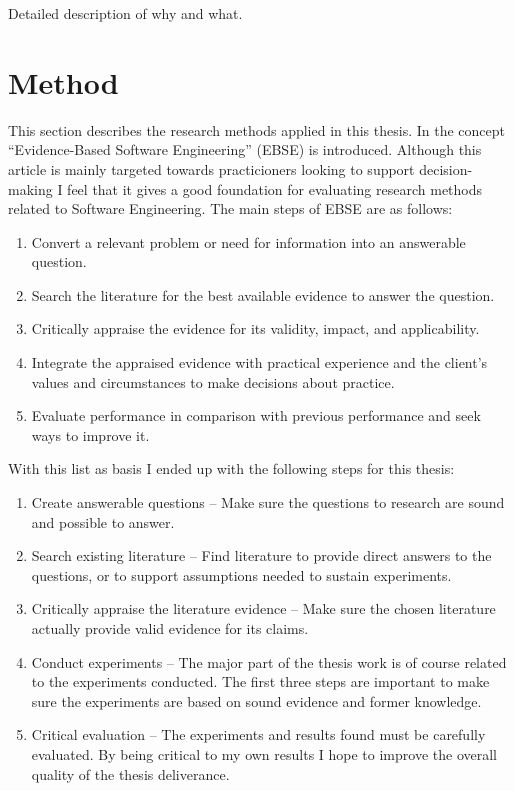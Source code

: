 \documentclass[a4paper,english]{report}
\begin{document}
Detailed description of why and what. 

\section{Method}

This section describes the research methods applied in this
thesis. In\cite{dyb08} the concept ``Evidence-Based Software
Engineering'' (EBSE) is introduced. Although this article is mainly
targeted towards practicioners looking to support decision-making I
feel that it gives a good foundation for evaluating research methods
related to Software Engineering. The main steps of EBSE are as
follows:

\begin{enumerate}
\item Convert a relevant problem or need for information into an
  answerable question.
\item Search the literature for the best available evidence to answer
  the question.
\item Critically appraise the evidence for its validity, impact, and
  applicability.
\item Integrate the appraised evidence with practical experience and
  the client's values and circumstances to make decisions about
  practice.
\item Evaluate performance in comparison with previous performance and
  seek ways to improve it.
\end{enumerate}

With this list as basis I ended up with the following steps for this
thesis:

\begin{enumerate}
\item Create answerable questions -- Make sure the questions to
  research are sound and possible to answer.
\item Search existing literature -- Find literature to provide direct
  answers to the questions, or to support assumptions needed to
  sustain experiments.
\item Critically appraise the literature evidence -- Make sure the
  chosen literature actually provide valid evidence for its claims.
\item Conduct experiments -- The major part of the thesis work is of
  course related to the experiments conducted. The first three steps
  are important to make sure the experiments are based on sound
  evidence and former knowledge.
\item Critical evaluation -- The experiments and results found must be
  carefully evaluated. By being critical to my own results I hope to
  improve the overall quality of the thesis deliverance.
\end{enumerate}
\end{document}
